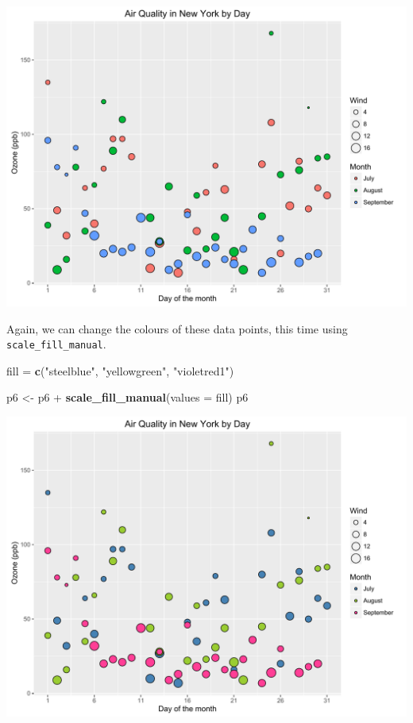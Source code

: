 \documentclass[]{article}
\newenvironment{Shaded}{\begin{snugshade}}{\end{snugshade}}
\newcommand{\KeywordTok}[1]{\textcolor[rgb]{0.13,0.29,0.53}{\textbf{{#1}}}}
\newcommand{\DataTypeTok}[1]{\textcolor[rgb]{0.13,0.29,0.53}{{#1}}}
\newcommand{\StringTok}[1]{\textcolor[rgb]{0.31,0.60,0.02}{{#1}}}
\newcommand{\NormalTok}[1]{{#1}}
\begin{document}
\begin{center}\includegraphics{0_all_posts_pdf/wscatter_10-1} \end{center}

Again, we can change the colours of these data points, this time using
\texttt{scale\_fill\_manual}.

\begin{Shaded}
\begin{Highlighting}[]
\NormalTok{fill =}\StringTok{ }\KeywordTok{c}\NormalTok{(}\StringTok{"steelblue"}\NormalTok{, }\StringTok{"yellowgreen"}\NormalTok{, }\StringTok{"violetred1"}\NormalTok{)}

\NormalTok{p6 <-}\StringTok{ }\NormalTok{p6 +}\StringTok{ }\KeywordTok{scale_fill_manual}\NormalTok{(}\DataTypeTok{values =} \NormalTok{fill)}
\NormalTok{p6}
\end{Highlighting}
\end{Shaded}

\begin{center}\includegraphics{0_all_posts_pdf/wscatter_11-1} \end{center}
\end{document}
